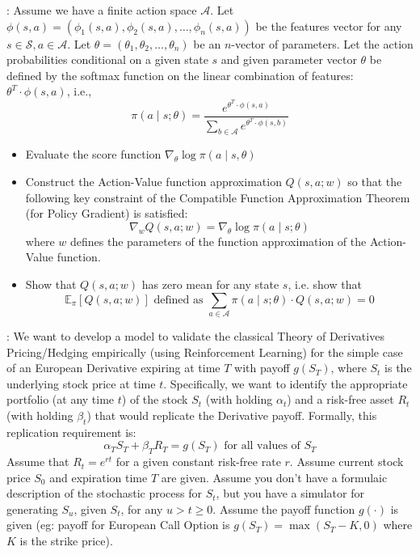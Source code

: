 \documentclass[12pt]{exam}
\begin{document}
\begin{questions}
: Assume we have a finite action space $\mathcal{A}$. Let $\phi(s,a) = (\phi_1(s,a), \phi_2(s,a), \ldots, \phi_n(s,a))$ be the features vector for any $s \in \mathcal{S}, a \in \mathcal{A}$. Let $\theta = (\theta_1, \theta_2, \ldots, \theta_n)$ be an $n$-vector of parameters. Let the action probabilities conditional on a given state $s$ and given parameter vector $\theta$ be defined by the softmax function on the linear combination of features: $\theta^T \cdot \phi(s,a)$, i.e.,
$$\pi(a \mid s;\theta) = \frac {e^{\theta^T \cdot \phi(s,a)}} {\sum_{b \in \mathcal{A}} e^{\theta^T \cdot \phi(s,b)}}$$
\begin{itemize}
\item Evaluate the score function $\nabla_{\theta} \log \pi(a \mid s,\theta)$
\item Construct the Action-Value function approximation $Q(s,a; w)$ so that the following key constraint of the Compatible Function Approximation Theorem (for Policy Gradient) is satisfied:
 $$\nabla_w Q(s,a;w) = \nabla_{\theta} \log \pi(a \mid s;\theta)$$
 where $w$ defines the parameters of the function approximation of the Action-Value function.
 \item Show that $Q(s,a;w)$ has zero mean for any state $s$, i.e. show that
 $$\mathbb{E}_{\pi} [Q(s,a;w)] \mbox{ defined as } \sum_{a \in \mathcal{A}} \pi(a \mid s;\theta) \cdot Q(s,a;w) = 0$$
\end{itemize}
\pagebreak


: We want to develop a model to validate the classical Theory of Derivatives Pricing/Hedging empirically (using Reinforcement Learning) for the simple case of an European Derivative expiring at time $T$ with payoff $g(S_T)$, where $S_t$ is the underlying stock price at time $t$. Specifically, we want to identify the appropriate portfolio (at any time $t$) of the stock $S_t$ (with holding $\alpha_t$) and a risk-free asset $R_t$ (with holding $\beta_t$) that would replicate the Derivative payoff. Formally, this replication requirement is:
$$\alpha_T S_T + \beta_T R_T = g(S_T) \mbox{ for all values of } S_T$$
Assume that $R_t = e^{rt}$ for a given constant risk-free rate $r$. Assume current stock price $S_0$ and expiration time $T$ are given. Assume you don't have a formulaic description of the stochastic process for $S_t$, but you have a simulator for generating $S_u$, given $S_t$, for any $u > t \geq 0$. Assume the payoff function $g(\cdot)$ is given (eg: payoff for European Call Option is $g(S_T) = \max(S_T - K, 0)$ where $K$ is the strike price).


\end{questions}
\end{document}
